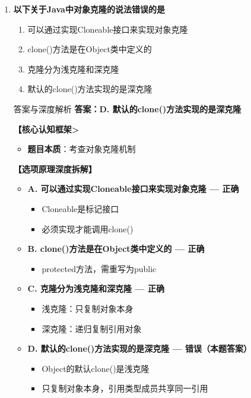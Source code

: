 \documentclass[12pt, a4paper]{ctexart}
\begin{document}
\begin{enumerate}[label=\textbf{\arabic*.}]
	      \vspace{1em}

	\item \textbf{以下关于Java中对象克隆的说法错误的是}
	      \begin{enumerate}[label=\Alph*.]
		      \item 可以通过实现Cloneable接口来实现对象克隆
		      \item clone()方法是在Object类中定义的
		      \item 克隆分为浅克隆和深克隆
		      \item 默认的clone()方法实现的是深克隆
	      \end{enumerate}

	      \begin{bluebox}{答案与深度解析}
		      \textbf{答案：D. 默认的clone()方法实现的是深克隆}

		      \textbf{【核心认知框架>}
		      \begin{itemize}[leftmargin=*, nosep, label={}]
			      \item \textbf{题目本质}：考查对象克隆机制
		      \end{itemize}

		      \textbf{【选项原理深度拆解】}
		      \begin{itemize}[label={}, nosep]
			      \item \textbf{A. 可以通过实现Cloneable接口来实现对象克隆 — 正确}
			      \begin{itemize}[label={}, nosep]
				      \item Cloneable是标记接口
				      \item 必须实现才能调用clone()
			      \end{itemize}
			      \item \textbf{B. clone()方法是在Object类中定义的 — 正确}
			      \begin{itemize}[label={}, nosep]
				      \item protected方法，需重写为public
			      \end{itemize}
			      \item \textbf{C. 克隆分为浅克隆和深克隆 — 正确}
			      \begin{itemize}[label={}, nosep]
				      \item 浅克隆：只复制对象本身
				      \item 深克隆：递归复制引用对象
			      \end{itemize}
			      \item \textbf{D. 默认的clone()方法实现的是深克隆 — 错误（本题答案）}
			      \begin{itemize}[label={}, nosep]
				      \item Object的默认clone()是浅克隆
				      \item 只复制对象本身，引用类型成员共享同一引用
			      \end{itemize}
		      \end{itemize}


\end{bluebox}
\end{enumerate}
\end{document}
